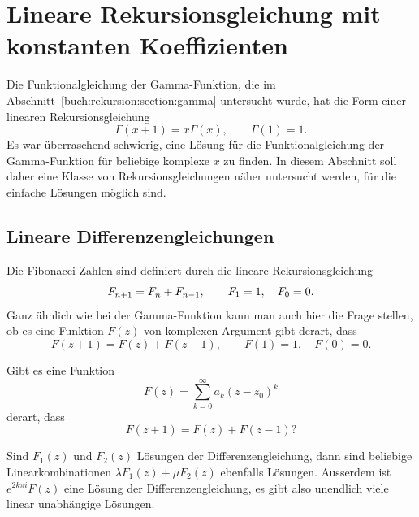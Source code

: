 %
%
%
\section{Lineare Rekursionsgleichung mit konstanten Koeffizienten
\label{buch:rekursion:section:linear}}
Die Funktionalgleichung der Gamma-Funktion, die im
Abschnitt~\ref{buch:rekursion:section:gamma} untersucht wurde,
hat die Form einer linearen Rekursionsgleichung
\[
\Gamma(x+1) = x\Gamma(x),\qquad \Gamma(1) = 1.
\]
%
Es war überraschend schwierig, eine Lösung für die Funktionalgleichung
der Gamma-Funktion für beliebige komplexe $x$ zu finden.
In diesem Abschnitt soll daher eine Klasse von Rekursionsgleichungen
näher untersucht werden, für die einfache Lösungen möglich sind.

%
%
\subsection{Lineare Differenzengleichungen}
Die Fibonacci-Zahlen sind definiert durch die lineare Rekursionsgleichung
\begin{equation}
F_{n+1\mathstrut} = F_{n\mathstrut} + F_{n-1\mathstrut},
\qquad
F_1=1,\quad F_0=0.
\label{buch:rekursion:eqn:fibonacci}
\end{equation}
%
Ganz ähnlich wie bei der Gamma-Funktion kann man auch hier die Frage
stellen, ob es eine Funktion $F(z)$ von komplexen Argument gibt derart,
dass
\begin{equation}
F(z+1) = F(z) + F(z-1), \qquad F(1)=1,\quad F(0)=0.
\label{buch:rekursion:eqn:fibonaccikomplex}
\end{equation}

\begin{aufgabe}
Gibt es eine Funktion
\[
F(z) = \sum_{k=0}^\infty a_k (z-z_0)^k
\]
derart, dass
\[
F(z+1) = F(z)+F(z-1)?
\]
\end{aufgabe}

Sind $F_1(z)$ und $F_2(z)$ Lösungen der Differenzengleichung, dann
sind beliebige Linearkombinationen $\lambda F_1(z) + \mu F_2(z)$
ebenfalls Lösungen.
Ausserdem ist $e^{2k\pi i}F(z)$ eine Lösung der Differenzengleichung,
es gibt also unendlich viele linear unabhängige Lösungen.

